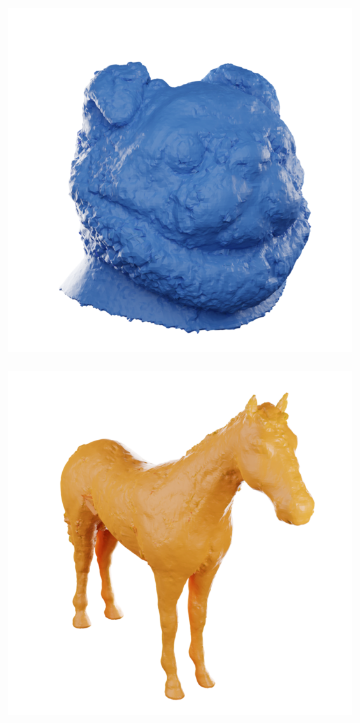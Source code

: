 \begin{figure}[tb]
\begin{subfigure}{0.19\linewidth}
  \includegraphics[width=\linewidth]{images/meshes/pug_frosting.png}
  \end{subfigure}
  \hfill
  \begin{subfigure}{0.19\linewidth}
  \includegraphics[width=\linewidth]{images/meshes/horse_y_frosting.png}

\end{subfigure}
\end{figure}

